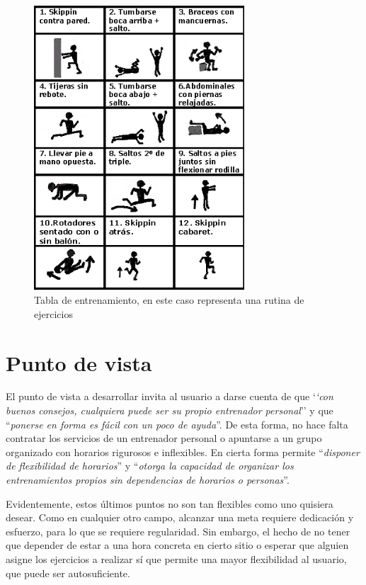 \documentclass[a4paper]{article}
\begin{document}
\begin{figure}[hbpt]

	\centering
	\includegraphics[width=0.7\textwidth]{./figuras/tabla_entr.jpg}
	\caption{Tabla de entrenamiento, en este caso representa una rutina de ejercicios}
	\label{fig:ejemplo}

\end{figure}

\section{Punto de vista}

El punto de vista a desarrollar invita al usuario a darse cuenta de que `\textit{`con buenos consejos, cualquiera puede ser su propio entrenador personal}'' y que ``\textit{ponerse en forma es fácil con un poco de ayuda}''. De esta forma, no hace falta contratar los servicios de un entrenador personal o apuntarse a un grupo organizado con horarios rigurosos e inflexibles. En cierta forma permite ``\textit{disponer de flexibilidad de horarios}'' y ``\textit{otorga la capacidad de organizar los entrenamientos propios sin dependencias de horarios o personas}''.

Evidentemente, estos últimos puntos no son tan flexibles como uno quisiera desear. Como en cualquier otro campo, alcanzar una meta requiere dedicación y esfuerzo, para lo que se requiere regularidad. Sin embargo, el hecho de no tener que depender de estar a una hora concreta en cierto sitio o esperar que alguien asigne los ejercicios a realizar sí que permite una mayor flexibilidad al usuario, que puede ser autosuficiente.
\end{document}
